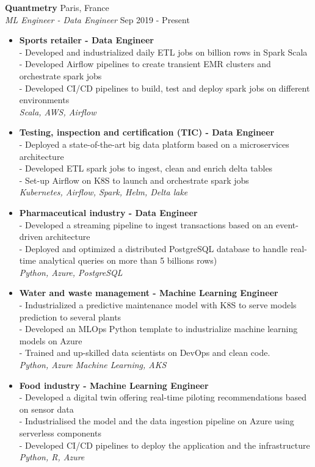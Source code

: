 \documentclass[a4paper]{article}
\begin{document}
\textbf{Quantmetry} \hfill Paris, France\\
\textit{ML Engineer - Data Engineer} \hfill Sep 2019 - Present\\
\vspace{-1mm}
\begin{itemize} \itemsep 1pt
	\item{\bf Sports retailer - Data Engineer}\\
	- Developed and industrialized daily ETL jobs on billion rows in Spark Scala \\
    - Developed Airflow pipelines to create transient EMR clusters and orchestrate spark jobs\\
    - Developed CI/CD pipelines to build, test and deploy spark jobs on different environments \\
    {\sl Scala, AWS, Airflow}\\
	\item {\bf Testing, inspection and certification (TIC) - Data Engineer} \\
	- Deployed a state-of-the-art big data platform based on a microservices architecture  \\
    - Developed ETL spark jobs to ingest, clean and enrich delta tables \\
    - Set-up Airflow on K8S to launch and orchestrate spark jobs \\
    {\sl Kubernetes, Airflow, Spark, Helm, Delta lake}\\
    \item {\bf Pharmaceutical industry - Data Engineer} \\
    - Developed a streaming pipeline to ingest transactions based on an event-driven architecture \\
    - Deployed and optimized a distributed PostgreSQL database to handle real-time analytical queries on more than 5 billions rows)\\
    {\sl Python, Azure, PostgreSQL}\\
    \item {\bf Water and waste management - Machine Learning Engineer} \\
    - Industrialized a predictive maintenance model with K8S to serve models prediction to several plants  \\
    - Developed an MLOps Python template to industrialize machine learning models on Azure  \\
    - Trained and up-skilled data scientists on DevOps and clean code.  \\
    {\sl Python, Azure Machine Learning, AKS}\\
    \item {\bf Food industry - Machine Learning Engineer} \\
    - Developed a digital twin offering real-time piloting recommendations based on sensor data \\
    - Industrialised the model and the data ingestion pipeline on Azure using serverless components \\
    - Developed CI/CD pipelines to deploy the application and the infrastructure \\
    {\sl Python, R, Azure}
\end{itemize}
\end{document}
